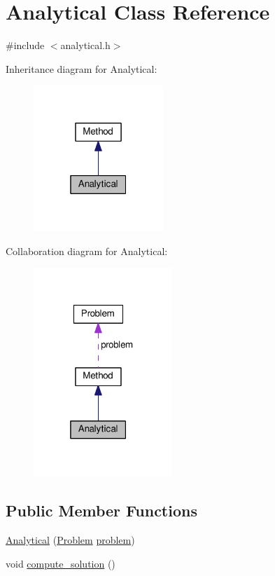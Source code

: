 \hypertarget{classAnalytical}{}\section{Analytical Class Reference}
\label{classAnalytical}


{\ttfamily \#include $<$analytical.\+h$>$}



Inheritance diagram for Analytical\+:
\nopagebreak
\begin{figure}[H]
\begin{center}
\leavevmode
\includegraphics[width=139pt]{classAnalytical__inherit__graph}
\end{center}
\end{figure}


Collaboration diagram for Analytical\+:
\nopagebreak
\begin{figure}[H]
\begin{center}
\leavevmode
\includegraphics[width=148pt]{classAnalytical__coll__graph}
\end{center}
\end{figure}
\subsection*{Public Member Functions}
\begin{DoxyCompactItemize}
\item 
\hyperlink{classAnalytical_a04b2afb565db2e19293799c169e42adb}{Analytical} (\hyperlink{classProblem}{Problem} \hyperlink{classMethod_a29a08a679b5d30a8c813766308205041}{problem})
\item 
void \hyperlink{classAnalytical_a48b4e86fd33f1dfd9f59b470cc1272a6}{compute\+\_\+solution} ()
\end{DoxyCompactItemize}
